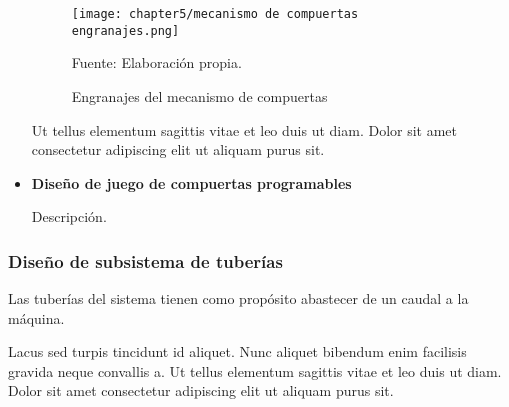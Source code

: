 \begin{itemize}
	\begin{figure}[H]
		\centering
		\texttt{[image: chapter5/mecanismo de compuertas engranajes.png]}
		\caption{Engranajes del mecanismo de compuertas}
		\begin{myflushleftportland}
			Fuente: Elaboración propia.
		\end{myflushleftportland}
		\label{fig:mecanismo de compuertas engranajes}
	\end{figure}
	
	Ut tellus elementum sagittis vitae et leo duis ut diam. Dolor sit amet consectetur adipiscing elit ut aliquam purus sit. 
	
	
	\item \textbf{Diseño de juego de compuertas programables}
	
	Descripción.

\end{itemize}



\subsubsection{Diseño de subsistema de tuberías}

Las tuberías del sistema tienen como propósito abastecer de un caudal a la máquina.

Lacus sed turpis tincidunt id aliquet. Nunc aliquet bibendum enim facilisis gravida neque convallis a. Ut tellus elementum sagittis vitae et leo duis ut diam. Dolor sit amet consectetur adipiscing elit ut aliquam purus sit. 

